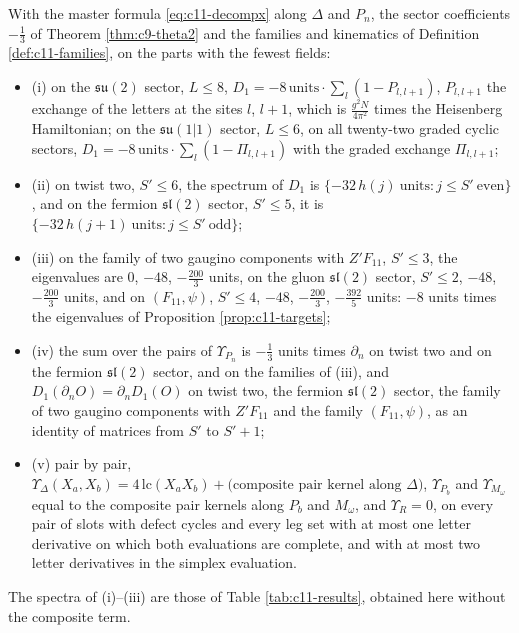 \begin{proposition}
\label{prop:c11-masterfam}
With the master formula \eqref{eq:c11-decompx} along $\Delta$ and $P_n$, the sector coefficients $-\tfrac13$ of Theorem \ref{thm:c9-theta2} and the families and kinematics of Definition \ref{def:c11-families}, on the parts with the fewest fields:
\begin{itemize}
\item (i) on the $\mathfrak{su}(2)$ sector, $L\le8$, $D_1=-8\,\text{units}\cdot\sum_l(1-P_{l,l+1})$, $P_{l,l+1}$ the exchange of the letters at the sites $l$, $l+1$, which is $\frac{g^2N}{4\pi^2}$ times the Heisenberg Hamiltonian; on the $\mathfrak{su}(1|1)$ sector, $L\le6$, on all twenty-two graded cyclic sectors, $D_1=-8\,\text{units}\cdot\sum_l(1-\Pi_{l,l+1})$ with the graded exchange $\Pi_{l,l+1}$;
\item (ii) on twist two, $S'\le6$, the spectrum of $D_1$ is $\{-32\,h(j)\ \text{units}: j\le S'\ \text{even}\}$, and on the fermion $\mathfrak{sl}(2)$ sector, $S'\le5$, it is $\{-32\,h(j+1)\ \text{units}: j\le S'\ \text{odd}\}$;
\item (iii) on the family of two gaugino components with $Z'F_{11}$, $S'\le3$, the eigenvalues are $0$, $-48$, $-\tfrac{200}3$ units, on the gluon $\mathfrak{sl}(2)$ sector, $S'\le2$, $-48$, $-\tfrac{200}3$ units, and on $(F_{11},\psi)$, $S'\le4$, $-48$, $-\tfrac{200}3$, $-\tfrac{392}5$ units: $-8$ units times the eigenvalues of Proposition \ref{prop:c11-targets};
\item (iv) the sum over the pairs of $\Upsilon_{P_n}$ is $-\tfrac13$ units times $\partial_n$ on twist two and on the fermion $\mathfrak{sl}(2)$ sector, and on the families of (iii), and $D_1(\partial_nO)=\partial_nD_1(O)$ on twist two, the fermion $\mathfrak{sl}(2)$ sector, the family of two gaugino components with $Z'F_{11}$ and the family $(F_{11},\psi)$, as an identity of matrices from $S'$ to $S'+1$;
\item (v) pair by pair, $\Upsilon_\Delta(X_a,X_b)=4\,\mathrm{lc}(X_aX_b)+\big(\text{composite pair kernel along }\Delta\big)$, $\Upsilon_{P_b}$ and $\Upsilon_{M_\omega}$ equal to the composite pair kernels along $P_b$ and $M_\omega$, and $\Upsilon_R=0$, on every pair of slots with defect cycles and every leg set with at most one letter derivative on which both evaluations are complete, and with at most two letter derivatives in the simplex evaluation.
\end{itemize}
The spectra of (i)--(iii) are those of Table \ref{tab:c11-results}, obtained here without the composite term.
\end{proposition}

